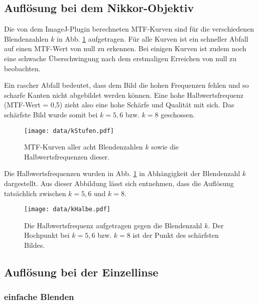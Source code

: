 	\subsection{Auflösung bei dem Nikkor-Objektiv}
		
		Die von dem ImageJ-Plugin berechneten MTF-Kurven sind für die verschiedenen Blendenzahlen $k$ in Abb. \ref{fig:kStufen} aufgetragen.
		Für alle Kurven ist ein schneller Abfall auf einen MTF-Wert von null zu erkennen.
		Bei einigen Kurven ist zudem noch eine schwache Überschwingung nach dem erstmaligen Erreichen von null zu beobachten.
		
		Ein rascher Abfall bedeutet, dass dem Bild die hohen Frequenzen fehlen und so scharfe Kanten nicht abgebildet werden können. 
		Eine hohe Halbwertsfrequenz (MTF-Wert = 0,5) zieht also eine hohe Schärfe und Qualität mit sich. 
		Das schärfste Bild wurde somit bei $k=5,6$ bzw. $k = 8$ geschossen.
		\begin{figure}[ht]
			\centering
			\texttt{[image: data/kStufen.pdf]}
			\caption{MTF-Kurven aller acht Blendenzahlen $k$ sowie die Halbwertsfrequenzen dieser. }
			\label{fig:kStufen}	
		\end{figure}
		
		Die Halbwertsfrequenzen wurden in Abb. \ref{fig:kStufen} in Abhängigkeit der Blendenzahl $k$ dargestellt.
		Aus dieser Abbildung lässt sich entnehmen, dass die Auflösung tatsächlich zwischen $k=5,6$ und $k = 8$.
		\begin{figure}[ht]
			\centering
			\texttt{[image: data/kHalbe.pdf]}
			\caption{Die Halbwertsfrequenz aufgetragen gegen die Blendenzahl $k$. Der Hochpunkt bei $k=5,6$ bzw. $k = 8$ ist der Punkt des schärfsten Bildes.}
			\label{fig:kHalbe}	
		\end{figure}
	
	\subsection{Auflösung bei der Einzellinse}

		\subsubsection{einfache Blenden}
			
